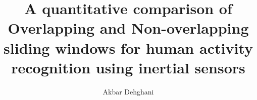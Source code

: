 \documentclass[letterpaper,11pt,onecolumn,final]{report}              %
\author{Akbar Dehghani}    %
\title{A quantitative comparison of Overlapping and Non-overlapping sliding windows for human activity recognition using inertial sensors}    %
\begin{document}
	












\appendix
\setcounter{table}{0}		%
\setcounter{figure}{0}		%
\renewcommand{\thefigure}{\Alph{chapter}.\arabic{figure}} 	%
\renewcommand{\thetable}{\Alph{chapter}.\arabic{table}}		%

\begin{appendices}
\end{appendices}







\end{document}
